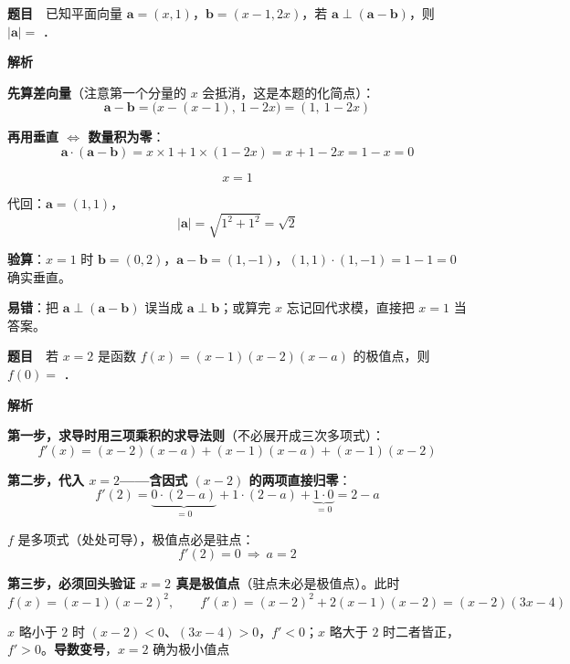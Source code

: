 \par\medskip



\textbf{题目}　已知平面向量 $\boldsymbol{a}=(x,1)$，$\boldsymbol{b}=(x-1,2x)$，若 $\boldsymbol{a}\perp(\boldsymbol{a}-\boldsymbol{b})$，则 $|\boldsymbol{a}|=$ \gkblank{}．

\textbf{解析}

\textbf{先算差向量}（注意第一个分量的 $x$ 会抵消，这是本题的化简点）：
\[\boldsymbol{a}-\boldsymbol{b}=\big(x-(x-1),\ 1-2x\big)=(1,\ 1-2x)\]

\textbf{再用垂直 $\iff$ 数量积为零}：
\[\boldsymbol{a}\cdot(\boldsymbol{a}-\boldsymbol{b})=x\times1+1\times(1-2x)=x+1-2x=1-x=0\]

\[x=1\]

代回：$\boldsymbol{a}=(1,1)$，
\[|\boldsymbol{a}|=\sqrt{1^2+1^2}=\sqrt2\]


\begin{gktip}
\textbf{验算}：$x=1$ 时 $\boldsymbol b=(0,2)$，$\boldsymbol a-\boldsymbol b=(1,-1)$，$(1,1)\cdot(1,-1)=1-1=0$  确实垂直。

\textbf{易错}：把 $\boldsymbol a\perp(\boldsymbol a-\boldsymbol b)$ 误当成 $\boldsymbol a\perp\boldsymbol b$；或算完 $x$ 忘记回代求模，直接把 $x=1$ 当答案。
\end{gktip}

\par\medskip


\textbf{题目}　若 $x=2$ 是函数 $f(x)=(x-1)(x-2)(x-a)$ 的极值点，则 $f(0)=$ \gkblank{}．

\textbf{解析}

\textbf{第一步，求导时用三项乘积的求导法则}（不必展开成三次多项式）：
\[f'(x)=(x-2)(x-a)+(x-1)(x-a)+(x-1)(x-2)\]

\textbf{第二步，代入 $x=2$——含因式 $(x-2)$ 的两项直接归零}：
\[f'(2)=\underbrace{0\cdot(2-a)}_{=0}+1\cdot(2-a)+\underbrace{1\cdot 0}_{=0}=2-a\]

$f$ 是多项式（处处可导），极值点必是驻点：
\[f'(2)=0\ \Longrightarrow\ a=2\]

\textbf{第三步，必须回头验证 $x=2$ 真是极值点}（驻点未必是极值点）。此时
\[f(x)=(x-1)(x-2)^2,\qquad f'(x)=(x-2)^2+2(x-1)(x-2)=(x-2)(3x-4)\]

$x$ 略小于 $2$ 时 $(x-2)<0$、$(3x-4)>0$，$f'<0$；$x$ 略大于 $2$ 时二者皆正，$f'>0$。\textbf{导数变号}，$x=2$ 确为极小值点 

